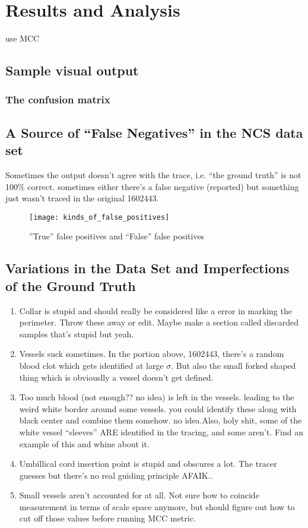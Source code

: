 \chapter{Results and Analysis} \label{ch:results-analysis}

use MCC \cite{mcc-original-paper}
\section{Sample visual output}
\subsection{The confusion matrix}
\section{A Source of ``False Negatives'' in the NCS data set} \label{sec:NCS-dataset-issues}

Sometimes the output doesn't agree with the trace, i.e. ``the ground truth'' is not 100\% correct.
sometimes either there's a false negative (reported) but something just wasn't traced in the original  1602443.

\begin{figure} \centering
	\texttt{[image: kinds\_of\_false\_positives]}
	\caption{''True'' false positives and ``False'' false positives}
\end{figure}

\section{Variations in the Data Set and Imperfections of the Ground Truth}

\begin{enumerate}
\item Collar is stupid and should really be considered like a error in marking the perimeter. Throw these away or edit. Maybe make a section called discarded samples that's stupid but yeah.
\item Vessels suck sometimes. In the portion above, 1602443, there's a random blood clot which gets identified at large $\sigma$. But also the small forked shaped thing which is obviouslly a vessel doesn't get defined.
\item Too much blood (not enough?? no idea) is left in the vessels. leading to the weird white border around some vessels. you could identify these along with black center and combine them somehow. no idea.Also, holy shit, some of the white vessel ``sleeves'' ARE identified in the tracing, and some aren't. Find an example of this and whine about it.
\item Umbillical cord insertion point is stupid and obscures a lot. The tracer guesses but there's no real guiding principle AFAIK..
\item Small vessels aren't accounted for at all. Not sure how to coincide measurement in terms of scale space anymore, but should figure out how to cut off those values before running MCC metric.
\end{enumerate}





